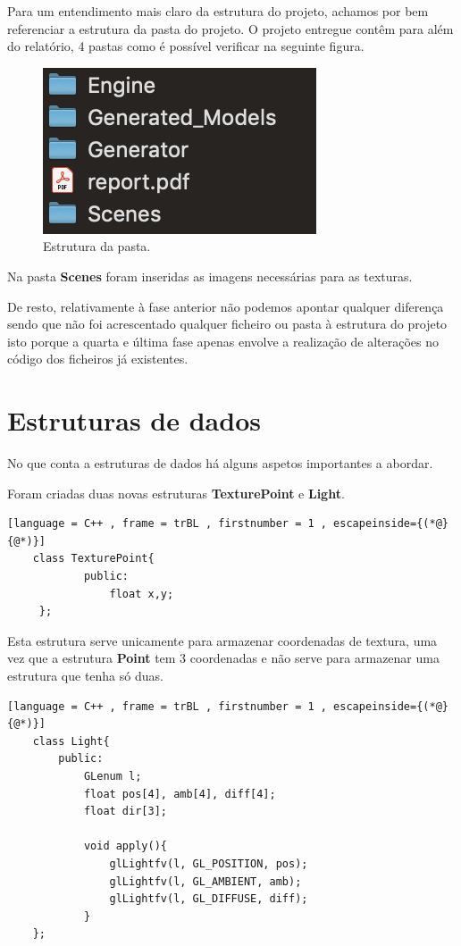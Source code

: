 \documentclass[a4paper]{article}
\begin{document}
Para um entendimento mais claro da estrutura do projeto, achamos por bem referenciar a estrutura da pasta do projeto.
O projeto entregue contêm para além do relatório, 4 pastas como é possível verificar na seguinte figura.

\begin{figure}[H]
\centering
\includegraphics[scale=1.0]{estrutura.png}
\caption{Estrutura da pasta.}
\label{img:estrutura}
\end{figure}

Na pasta \textbf{Scenes} foram inseridas as imagens necessárias para as texturas.

De resto, relativamente à fase anterior não podemos apontar qualquer diferença sendo que não foi acrescentado qualquer ficheiro ou pasta à estrutura do projeto isto porque a quarta e última fase apenas envolve a realização de alterações no código dos ficheiros já existentes.

\newpage

\section{Estruturas de dados}
\label{sec:estruturadados}

No que conta a estruturas de dados há alguns aspetos importantes a abordar.

Foram criadas duas novas estruturas \textbf{TexturePoint} e \textbf{Light}.

\begin{lstlisting}[language = C++ , frame = trBL , firstnumber = 1 , escapeinside={(*@}{@*)}]
	class TexturePoint{
        	public:
           		float x,y;
   	 };
\end{lstlisting}

Esta estrutura serve unicamente para armazenar coordenadas de textura, uma vez que a estrutura \textbf{Point} tem 3 coordenadas e não serve para armazenar uma estrutura que tenha só duas.

\begin{lstlisting}[language = C++ , frame = trBL , firstnumber = 1 , escapeinside={(*@}{@*)}]
	class Light{
        public:
        	GLenum l;
        	float pos[4], amb[4], diff[4];
        	float dir[3];

        	void apply(){
        		glLightfv(l, GL_POSITION, pos);
        		glLightfv(l, GL_AMBIENT, amb);
        		glLightfv(l, GL_DIFFUSE, diff);
        	}
    };
\end{lstlisting}
\end{document}
